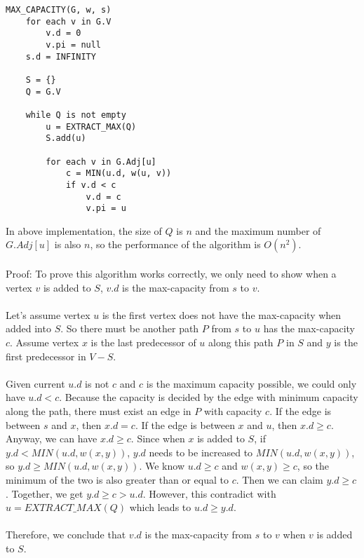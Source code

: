 \documentclass{article}
\begin{document}
\begin{verbatim}
MAX_CAPACITY(G, w, s)
    for each v in G.V
        v.d = 0
        v.pi = null
    s.d = INFINITY

    S = {}
    Q = G.V

    while Q is not empty
        u = EXTRACT_MAX(Q)
        S.add(u)

        for each v in G.Adj[u]
            c = MIN(u.d, w(u, v))
            if v.d < c
                v.d = c
                v.pi = u
\end{verbatim}

In above implementation, the size of $Q$ is $n$ and the maximum number of $G.Adj[u]$ is also $n$, so the performance of the algorithm is $O(n^2)$.

\paragraph{}
Proof: To prove this algorithm works correctly, we only need to show when a vertex $v$ is added to $S$, $v.d$ is the max-capacity from $s$ to $v$.

\paragraph{}
Let's assume vertex $u$ is the first vertex does not have the max-capacity when added into $S$. So there must be another path $P$ from $s$ to $u$ has the max-capacity $c$. Assume vertex $x$ is the last predecessor of $u$ along this path $P$ in $S$ and $y$ is the first predecessor in $V-S$.

\paragraph{}
Given current $u.d$ is not $c$ and $c$ is the maximum capacity possible, we could only have $u.d < c$. Because the capacity is decided by the edge with minimum capacity along the path, there must exist an edge in $P$ with capacity $c$. If the edge is between $s$ and $x$, then $x.d = c$. If the edge is between $x$ and $u$, then $x.d \ge c$. Anyway, we can have $x.d \ge c$. Since when $x$ is added to $S$, if $y.d < MIN(u.d, w(x, y))$, $y.d$ needs to be increased to $MIN(u.d, w(x, y))$, so $y.d \ge MIN(u.d, w(x, y))$. We know $u.d \ge c$ and $w(x, y) \ge c$, so the minimum of the two is also greater than or equal to $c$. Then we can claim $y.d \ge c$.
Together, we get $y.d \ge c > u.d$. However, this contradict with $u = EXTRACT\_MAX(Q)$ which leads to $u.d \ge y.d$.

\paragraph{}
Therefore, we conclude that $v.d$ is the max-capacity from $s$ to $v$ when $v$ is added to $S$.
\end{document}
